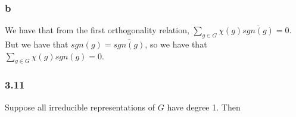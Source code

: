 \documentclass[]{article}
\begin{document}
\subsubsection*{b}
We have that from the first orthogonality relation,
$\sum_{g \in G} \chi(g) \overline{sgn(g)} = 0$. But we have that $sgn(g) = \overline{sgn(g)}$, so we have that $\sum_{g \in G} \chi(g)sgn(g) = 0$. 
%

\subsubsection*{3.11}
Suppose all irreducible representations of $G$ have degree 1. Then 
\end{document}
